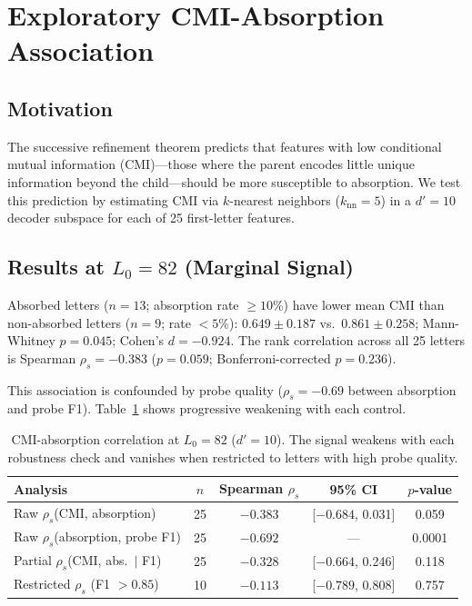 \documentclass{article}
\begin{document}
\section{Exploratory CMI-Absorption Association}
\label{sec:cmi}

\subsection{Motivation}

The successive refinement theorem \citep{equitz1991successive} predicts that features with low conditional mutual information (CMI)---those where the parent encodes little unique information beyond the child---should be more susceptible to absorption. We test this prediction by estimating CMI via $k$-nearest neighbors \citep{kraskov2004estimating} ($k_{\text{nn}} = 5$) in a $d' = 10$ decoder subspace for each of 25 first-letter features.

\subsection{Results at $L_0 = 82$ (Marginal Signal)}

Absorbed letters ($n = 13$; absorption rate $\geq 10\%$) have lower mean CMI than non-absorbed letters ($n = 9$; rate $< 5\%$): $0.649 \pm 0.187$ vs.\ $0.861 \pm 0.258$; Mann-Whitney $p = 0.045$; Cohen's $d = -0.924$. The rank correlation across all 25 letters is Spearman $\rho_s = -0.383$ ($p = 0.059$; Bonferroni-corrected $p = 0.236$).

This association is confounded by probe quality ($\rho_s = -0.69$ between absorption and probe F1). Table~\ref{tab:cmi} shows progressive weakening with each control.

\begin{table}[t]
\caption{CMI-absorption correlation at $L_0 = 82$ ($d' = 10$). The signal weakens with each robustness check and vanishes when restricted to letters with high probe quality.}
\label{tab:cmi}
\centering
\small
\begin{tabular}{lcccc}
\toprule
Analysis & $n$ & Spearman $\rho_s$ & 95\% CI & $p$-value \\
\midrule
Raw $\rho_s$(CMI, absorption) & 25 & $-0.383$ & [$-0.684$, 0.031] & 0.059 \\
Raw $\rho_s$(absorption, probe F1) & 25 & $-0.692$ & --- & 0.0001 \\
Partial $\rho_s$(CMI, abs.\ $\mid$ F1) & 25 & $-0.328$ & [$-0.664$, 0.246] & 0.118 \\
Restricted $\rho_s$ (F1 $> 0.85$) & 10 & $-0.113$ & [$-0.789$, 0.808] & 0.757 \\
\bottomrule
\end{tabular}
\end{table}
\end{document}
